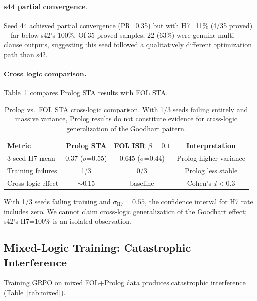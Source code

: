 \documentclass[11pt,a4paper]{article}
\newcommand{\GRPO}{\textsc{GRPO}}
\begin{document}
\paragraph{s44 partial convergence.} Seed 44 achieved partial convergence (PR=0.35) but with H7=11\% (4/35 proved)---far below s42's 100\%. Of 35 proved samples, 22 (63\%) were genuine multi-clause outputs, suggesting this seed followed a qualitatively different optimization path than s42.

\paragraph{Cross-logic comparison.} Table~\ref{tab:cross_logic_compare} compares Prolog STA results with FOL STA.

\begin{table}[h]
\centering
\small
\begin{tabular}{lccc}
\toprule
\textbf{Metric} & \textbf{Prolog STA} & \textbf{FOL ISR $\beta{=}0.1$} & \textbf{Interpretation} \\
\midrule
3-seed H7 mean & 0.37 ($\sigma$=0.55) & 0.645 ($\sigma$=0.44) & Prolog higher variance \\
Training failures & 1/3 & 0/3 & Prolog less stable \\
Cross-logic effect & $\sim$0.15 & baseline & Cohen's $d < 0.3$ \\
\bottomrule
\end{tabular}
\caption{Prolog vs.\ FOL STA cross-logic comparison. With 1/3 seeds failing entirely and massive variance, Prolog results do not constitute evidence for cross-logic generalization of the Goodhart pattern.}
\label{tab:cross_logic_compare}
\end{table}

With 1/3 seeds failing training and $\sigma_{\text{H7}}=0.55$, the confidence interval for H7 rate includes zero. We cannot claim cross-logic generalization of the Goodhart effect; s42's H7=100\% is an isolated observation.

\subsection{Mixed-Logic Training: Catastrophic Interference}

Training \GRPO{} on mixed FOL+Prolog data produces catastrophic interference (Table~\ref{tab:mixed}).
\end{document}
